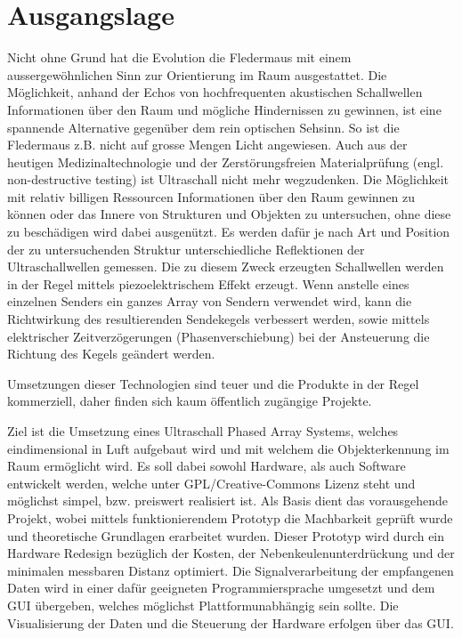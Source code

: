 \documentclass[10pt,a4paper,oneside]{99_fhnwreport}
\begin{document}
\section{Ausgangslage}\label{sec:ausgangslage}
Nicht ohne Grund hat die Evolution die Fledermaus mit einem aussergewöhnlichen Sinn zur Orientierung im Raum ausgestattet. Die Möglichkeit, anhand der Echos von hochfrequenten akustischen Schallwellen Informationen über den Raum und mögliche Hindernissen zu gewinnen, ist eine spannende Alternative gegenüber dem rein optischen Sehsinn. So ist die Fledermaus z.B. nicht auf grosse Mengen Licht angewiesen. Auch aus der heutigen Medizinaltechnologie und der Zerstörungsfreien Materialprüfung (engl. non-destructive testing) ist Ultraschall nicht mehr wegzudenken. Die Möglichkeit mit relativ billigen Ressourcen Informationen über den Raum gewinnen zu können oder das Innere von Strukturen und Objekten zu untersuchen, ohne diese zu beschädigen wird dabei ausgenützt. Es werden dafür je nach Art und Position der zu untersuchenden Struktur unterschiedliche Reflektionen der Ultraschallwellen gemessen. Die zu diesem Zweck erzeugten Schallwellen werden in der Regel mittels piezoelektrischem Effekt erzeugt. Wenn anstelle eines einzelnen Senders ein ganzes Array von Sendern verwendet wird, kann die Richtwirkung des resultierenden Sendekegels verbessert werden, sowie mittels elektrischer Zeitverzögerungen (Phasenverschiebung) bei der Ansteuerung die Richtung des Kegels geändert werden.

Umsetzungen dieser Technologien sind teuer und die Produkte in der Regel kommerziell, daher finden sich kaum öffentlich zugängige Projekte.

Ziel ist die Umsetzung eines Ultraschall Phased Array Systems, welches eindimensional in Luft aufgebaut wird und mit welchem die Objekterkennung im Raum ermöglicht wird. Es soll dabei sowohl Hardware, als auch Software entwickelt werden, welche unter GPL/Creative-Commons Lizenz steht und möglichst simpel, bzw. preiswert realisiert ist.
Als Basis dient das vorausgehende Projekt, wobei mittels funktionierendem Prototyp die Machbarkeit geprüft wurde und theoretische Grundlagen erarbeitet wurden. Dieser Prototyp wird durch ein Hardware Redesign bezüglich der Kosten, der Nebenkeulenunterdrückung und der minimalen messbaren Distanz optimiert. Die Signalverarbeitung der empfangenen Daten wird in einer dafür geeigneten Programmiersprache umgesetzt und dem GUI übergeben, welches möglichst Plattformunabhängig sein sollte. Die Visualisierung der Daten und die Steuerung der Hardware erfolgen über das GUI.
\end{document}
